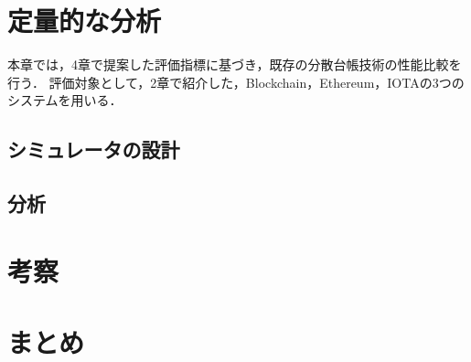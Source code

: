 \documentclass[japanese, macos]{KU2}
\begin{document}
\chapter{定量的な分析}
本章では，4章で提案した評価指標に基づき，既存の分散台帳技術の性能比較を行う．
評価対象として，2章で紹介した，Blockchain，Ethereum，IOTAの3つのシステムを用いる．
\section{シミュレータの設計}


\section{分析}


\chapter{考察}


\chapter{まとめ}


\end{document}
